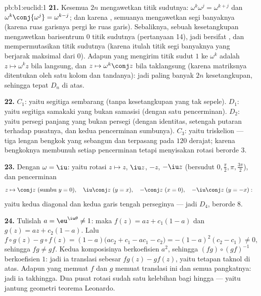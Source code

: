 \begin{solution}{pb:b1:euclid:1}
\textbf{21.} Kesemua $2n$  mengawetkan  titik sudutnya: $\omega^k
\omega^j = \omega^{k+j}$ dan $\omega^k\conj{\omega^j} =
\omega^{k-j}$; dan karena , semuanya mengawetkan segi banyaknya
(karena ruas garisnya pergi ke ruas garis). Sebaliknya, sebuah kesetangkupan mengawetkan
barisentrum $0$ titik sudutnya (pertanyaan 14), jadi bersifat ,
dan mempermutasikan titik sudutnya (karena itulah titik segi banyaknya
yang berjarak maksimal dari $0$). Adapun   yang mengirim
titik sudut $1$ ke $\omega^k$ adalah $z \mapsto \omega^k z$ bila langsung,
dan $z \mapsto \omega^k\conj z$ bila taklangsung (karena matriksnya
ditentukan oleh satu kolom dan tandanya): jadi paling banyak $2n$
kesetangkupan, sehingga tepat $D_n$ di atas.

\textbf{22.} $C_1$: yaitu segitiga sembarang (tanpa kesetangkupan
yang tak sepele). $D_1$: yaitu segitiga samakaki yang bukan samasisi (dengan satu
pencerminan). $D_2$: yaitu persegi panjang yang bukan persegi (dengan identitas,
setengah putaran terhadap pusatnya, dan kedua pencerminan sumbunya). $C_3$: yaitu
triskelion --- tiga lengan bengkok yang sebangun dan terpasang pada 
$120$ derajat; karena bengkoknya membunuh setiap pencerminan tetapi menyisakan
rotasi berorde $3$.

\textbf{23.} Dengan $\omega = \iu$: yaitu rotasi $z \mapsto z$,
$\iu z$, $-z$, $-\iu z$ (bersudut $0, \frac\pi2, \pi,
\frac{3\pi}2$), dan pencerminan
\[
z \mapsto \conj z \ (\text{sumbu } y = 0), \quad
\iu\conj z \ (y = x), \quad
-\conj z \ (x = 0), \quad
-\iu\conj z \ (y = -x):
\]
yaitu kedua diagonal dan kedua garis tengah perseginya --- jadi
 $D_4$, berorde $8$.

\textbf{24.} Tulislah $a = \eu^{\iu\theta} \neq 1$: maka $f(z) = az +
c_1(1 - a)$ dan $g(z) = az + c_2(1 - a)$. Lalu
\[
f\circ g(z) - g\circ f(z)
= (1-a)\bigl(ac_2 + c_1 - ac_1 - c_2\bigr)
= -(1 - a)^2(c_2 - c_1) \neq 0 ,
\]
sehingga $f g \neq g f$. Kedua komposisinya berkoefisien 
$a^2$, sehingga $(fg)\circ(gf)^{-1}$ berkoefisien  $1$: jadi ia
translasi sebesar $fg(z) - gf(z)$, yaitu tetapan taknol di atas.
Adapun  yang memuat $f$ dan $g$ memuat translasi ini dan
semua pangkatnya: jadi ia takhingga. Dua pusat rotasi sudah satu
kelebihan bagi  hingga --- yaitu jantung geometri teorema
Leonardo.


\end{solution}
